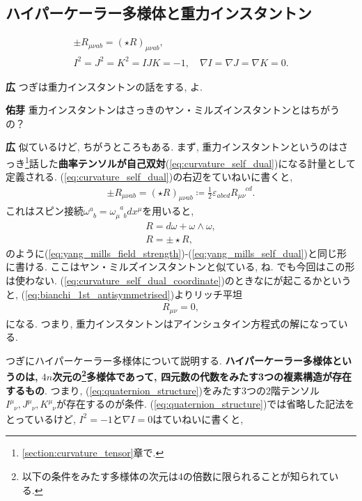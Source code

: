\documentclass{ltjsarticle}
\theoremstyle{definition}
\newcommand{\parno}{\par\noindent}
\begin{document}
\subsection{ハイパーケーラー多様体と重力インスタントン\label{subsection:gravitational_instanton}}
\begin{tcolorbox}
  \begin{gather}
    \pm R_{\mu\nu ab}=\left(\star R\right)_{\mu\nu ab},\label{eq:curvature_self_dual}\\
    I^2=J^2=K^2=IJK=-1,\quad\nabla I=\nabla J=\nabla K=0.\label{eq:quaternion_structure}
  \end{gather}
\end{tcolorbox}
\parno
\textbf{広} つぎは重力インスタントンの話をする, よ.\parno
\textbf{佑芽} 重力インスタントンはさっきのヤン・ミルズインスタントンとはちがうの？\parno
\textbf{広} 似ているけど, ちがうところもある. まず, 重力インスタントンというのはさっき\footnote{\ref{section:curvature_tensor}章で.}話した\textbf{曲率テンソルが自己双対}(\ref{eq:curvature_self_dual})になる計量として定義される. (\ref{eq:curvature_self_dual})の右辺をていねいに書くと,
\begin{gather}
  \pm R_{\mu\nu ab}=\left(\star R\right)_{\mu\nu ab}\coloneqq\frac12\varepsilon_{abcd}R_{\mu\nu}^{\phantom{\mu\nu}cd}.\label{eq:curvature_self_dual_coordinate}
\end{gather}
これはスピン接続$\omega^a_{\phantom{a}b}=\omega_{\mu\phantom{a}b}^{\phantom{\mu}a}dx^\mu$を用いると,
\begin{gather}
  R=d\omega+\omega\wedge\omega,\\
  R=\pm\star R,
\end{gather}
のように(\ref{eq:yang_mills_field_strength})-(\ref{eq:yang_mills_self_dual})と同じ形に書ける. ここはヤン・ミルズインスタントンと似ている, ね. でも今回はこの形は使わない. (\ref{eq:curvature_self_dual_coordinate})のときなにが起こるかというと, 
(\ref{eq:bianchi_1st_antisymmetrised})よりリッチ平坦
\begin{gather}
  R_{\mu\nu}=0,
\end{gather}
になる. つまり, 重力インスタントンはアインシュタイン方程式の解になっている.\par
つぎにハイパーケーラー多様体について説明する. \textbf{ハイパーケーラー多様体というのは, $4n$次元の\footnote{以下の条件をみたす多様体の次元は4の倍数に限られることが知られている.}多様体であって, 四元数の代数をみたす3つの複素構造が存在するもの}. つまり, (\ref{eq:quaternion_structure})をみたす3つの2階テンソル$I^\mu_{\phantom{\mu}\nu},J^\mu_{\phantom{\mu}\nu},K^\mu_{\phantom{\mu}\nu}$が存在するのが条件. (\ref{eq:quaternion_structure})では省略した記法をとっているけど, $I^2=-1$と$\nabla I=0$はていねいに書くと,
\end{document}
